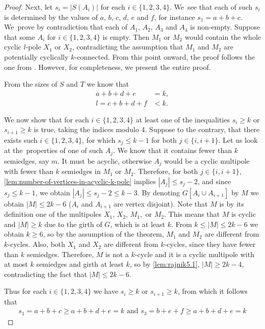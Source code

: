 \documentclass[12pt, twoside]{book}
\begin{document}
\begin{proof}
	Next, let $s_i=|S(A_i)|$ for each $i\in\{1,2,3,4\}$. We~see that each of such $s_i$ is determined by the values of $a,\,b,\,c,\,d,\,e$ and $f$, for instance $s_1=a+b+c$. We~prove by contradiction that each of $A_1, \,A_2,\,A_3$ and $A_4$ is non-empty. Suppose that some $A_i$ for $i\in\{1,2,3,4\}$ is empty. Then $M_1$ or $M_2$ would contain the whole cyclic $l$-pole $X_1$ or $X_2$, contradicting the assumption that $M_1$ and $M_2$ are potentially cyclically $k$-connected. From this point onward, the proof follows the one from \mbox{\cite[Theorem 5.2]{Rajnik_phd}}. However, for completeness, we present the entire proof.
	
	From the sizes of $S$ and $T$ we know that
	\begin{align*}
		a+b+d+e &= k,\\
		l=c+b+d+f &< k.
	\end{align*}
	
	We now show that for each $i\in\{1,2,3,4\}$ at least one of the inequalities $s_i\geq k$ or $s_{i+1}\geq k$ is true, taking the indices modulo 4. Suppose to the contrary, that there exists such $i\in\{1,2,3,4\}$, for which $s_j\leq k-1$ for both $j\in\{i, i+1\}$. Let us look at the~properties of one of such $A_j$. We know that it contains fewer than $k$ semiedges, say $m$. It must be acyclic, otherwise $A_j$ would be a cyclic multipole with fewer than $k$ semiedges in $M_1$ or $M_2$. Therefore, for both $j\in\{i,i+1\}$, \cref{lem:number-of-vertices-in-acyclic-k-pole} implies $|A_j|\leq s_j-2$, and since $s_j\leq k-1$, we obtain $|A_j|\leq s_j-2\leq k-3$. By denoting $G[A_i\cup A_{i+1}]$ by $M$ we obtain $|M|\leq 2k-6$ ($A_i$ and $A_{i+1}$ are vertex disjoint). Note that $M$ is by its definition one of the multipoles $X_1, \,X_2,\,M_1,$ or $M_2$. This means that $M$ is cyclic and $|M|\geq k$ due to the girth of $G$, which is at least $k$. From $k\leq |M|\leq 2k-6$ we obtain $k\geq 6$, so by the assumption of the theorem, $M_1$ and $M_2$ are different from $k$-cycles. Also, both $X_1$ and $X_2$ are different from $k$-cycles, since they have fewer than $k$ semiedges. Therefore, $M$ is not a $k$-cycle and it is a cyclic multipole with at most $k$ semiedges and girth at least $k$, so by \cref{lem:rajnik5.1}, $|M| \geq 2k - 4$, contradicting the fact that $|M|\leq 2k-6$.
	
	Thus for each $i\in\{1,2,3,4\}$ we have $s_i\geq k$ or $s_{i+1}\geq k$, from which it follows that
	\begin{align*}
	s_1 =a+b+c\geq a+b+d+e=k \text{ and } s_3 =b+e+f \geq a+b+d+e=k
	\end{align*}
	

\end{proof}
\end{document}

